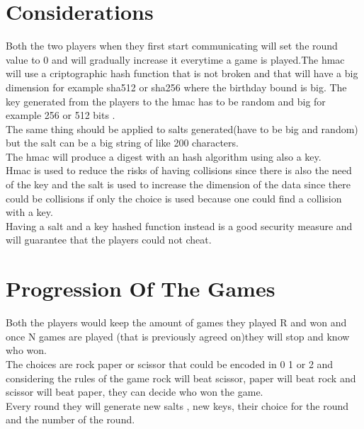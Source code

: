 \documentclass{article}
\begin{document}
\section{Considerations}
Both the two players when they first start communicating will set the round value to 0 and will gradually increase it everytime a game is played.The hmac will use a criptographic hash function that is not broken and that will have a big dimension for example sha512 or sha256 where the birthday bound is big. The key generated from the players to the hmac has to be random and big for example 256 or 512 bits .\\
The same thing should be applied to salts generated(have to be big and random) but the salt can be a big string of like 200 characters.\\
The hmac will produce a digest with an hash algorithm using also a key.\\
Hmac is used to reduce the risks of having collisions since there is also the need of the key and the salt is used to increase the dimension of the data since there could be collisions if only the choice is used because one could find a collision with a key.\\
Having a salt and a key hashed function instead is a good security measure and will guarantee that the players could not cheat.\\

\section{Progression Of The Games}
Both the players would keep the amount of games they played R and won and once N games are played (that is previously agreed on)they will stop and know who won.\\
The choices are rock paper or scissor that could be encoded in 0 1 or 2 and considering the rules of the game rock will beat scissor, paper will beat rock and scissor will beat paper, they can decide who won the game.\\
Every round they will generate new salts , new keys, their choice for the round and the number of the round.
\end{document}
